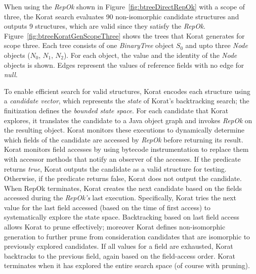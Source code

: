 \para When using the \emph{RepOk} shown in Figure~\ref{fig:btreeDirectRepOk} with a scope of three, the Korat search
evaluates 90 non-isomorphic candidate structures and outputs 9
structures, which are valid since they satisfy the \emph{RepOk}.
Figure~\ref{fig:btreeKoratGenScopeThree} shows the trees that Korat
generates for scope three. Each tree consists of one \emph{BinaryTree}
object $S_0$ and upto three \emph{Node} objects ($N_0$, $N_1$,
$N_2$). For each object, the value and the identity of the \emph{Node}
objects is shown. Edges represent the values of reference fields with
no edge for \emph{null}.


\para To enable efficient search for valid structures, Korat encodes
each structure using a \emph{candidate vector}, which represents the
\emph{state} of Korat's backtracking search; the finitization defines
the \emph{bounded state space}.  For each candidate that Korat
explores, it translates the candidate to a Java object graph and
invokes \emph{RepOk} on the resulting object.  Korat monitors these
executions to dynamically determine which fields of the candidate are
accessed by \emph{RepOk} before returning its result.  Korat monitors field
accesses by using bytecode instrumentation to replace them with
accessor methods that notify an observer of the accesses. If the
predicate returns \emph{true}, Korat outputs the candidate as a valid
structure for testing. Otherwise, if the predicate returns false,
Korat does not output the candidate.  When RepOk terminates, Korat
creates the next candidate based on the fields accessed during the
\emph{RepOk's} last execution.  Specifically, Korat tries the next value for
the last field accessed (based on the time of first access) to
systematically explore the state space.  Backtracking based on last
field access allows Korat to prune effectively; moreover Korat defines
non-isomorphic generation to further prune from consideration
candidates that are isomorphic to previously explored candidates.  If
all values for a field are exhausted, Korat backtracks to the previous
field, again based on the field-access order.  Korat terminates when
it has explored the entire search space (of course with pruning).

